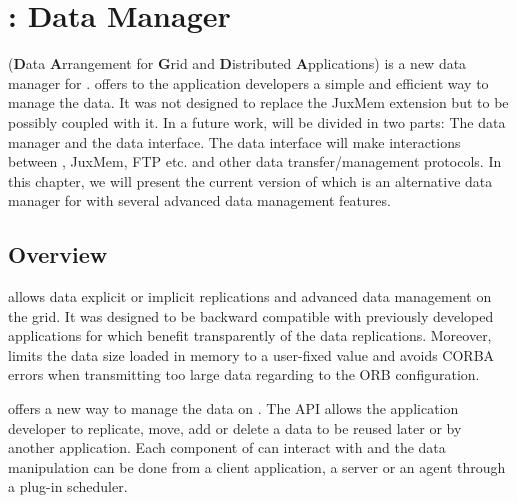 

\chapter{\dagda: Data Manager}
\label{ch:dagda}

\dagda (\textbf{D}ata \textbf{A}rrangement for \textbf{G}rid and
\textbf{D}istributed \textbf{A}pplications) is a new data manager for
\diet. \dagda offers to the \diet application developers a simple
and efficient way to manage the data. It was not designed to replace
the JuxMem extension but to be possibly coupled with it. In a future
work, \dagda will be divided in two parts: The \dagda data manager and
the \dagda data interface. The data interface will make interactions
between \dagda, JuxMem, FTP etc. and other data transfer/management
protocols. In this chapter, we will present the current version of
\dagda which is an alternative data manager for \diet with several
advanced data management features.

\section{Overview}

\dagda allows data explicit or implicit replications and advanced data
management on the grid. It was designed to be backward compatible with
previously developed applications for \diet which benefit
transparently of the data replications. Moreover, \dagda limits the
data size loaded in memory to a user-fixed value and avoids CORBA
errors when transmitting too large data regarding to the ORB
configuration. 

\dagda offers a new way to manage the data on \diet. The API allows
the application developer to replicate, move, add or delete a data to
be reused later or by another application. Each component of \diet can
interact with \dagda and the data manipulation can be done from a
client application, a server or an agent through a plug-in scheduler.


